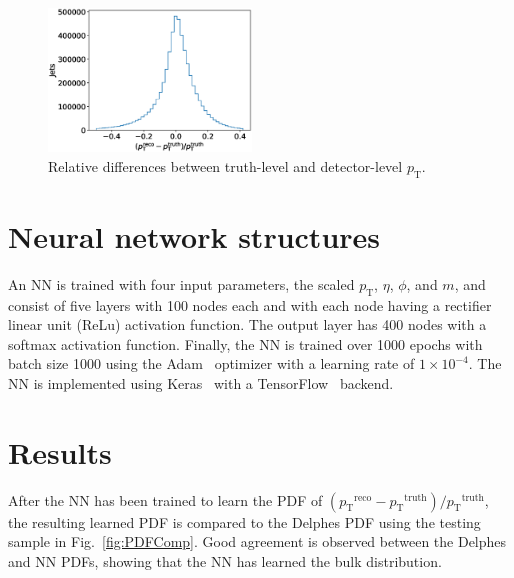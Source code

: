 \documentclass[showpacs,showkeys,preprint,prd,nofootinbib,linenumbers,12pt,superscriptaddress]{revtex4-1}
\def\pt{\ensuremath{p_{\mathrm{T}}}}
\def\ptRes{\ensuremath{(\pt^{\mathrm{reco}}-\pt^{\mathrm{truth}})/\pt^{\mathrm{truth}}}}
\begin{document}
\begin{figure}[h]
  \includegraphics[width=0.48\textwidth]{figures/nn/pTRes_nobounds_prescaling.eps}
  \caption{Relative differences between truth-level and detector-level \pt.}
  \label{fig:deltaTarget}
\end{figure}

\section{Neural network structures}

An NN is trained with four input parameters, the scaled \pt, $\eta$, $\phi$, and $m$, and consist of five layers with 100 nodes each and with each node having a rectifier linear unit (ReLu) activation function. The output layer has 400 nodes with a softmax activation function. Finally, the NN is trained over 1000 epochs with batch size 1000 using the Adam~\cite{adam} optimizer with a learning rate of $1\times10^{-4}$. The NN is implemented using Keras~\cite{chollet2015keras} with a TensorFlow~\cite{tensorflow2015-whitepaper} backend.


\section{Results}

After the NN has been trained to learn the PDF of \ptRes, the resulting learned PDF is compared to the Delphes PDF using the testing sample in Fig.~\ref{fig:PDFComp}. Good agreement is observed between the Delphes and NN PDFs, showing that the NN has learned the bulk distribution.
\end{document}
